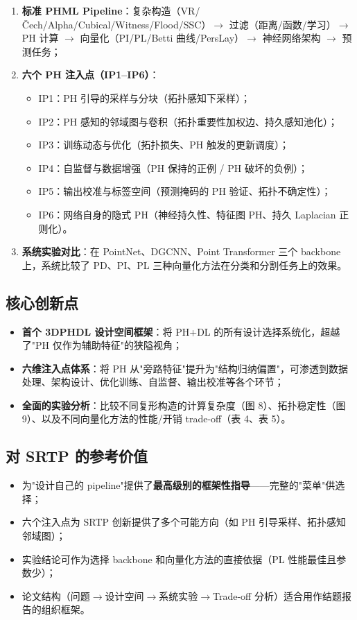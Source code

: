 \documentclass[11pt,a4paper]{article}
\begin{document}
\begin{enumerate}[nosep]
  \item \textbf{标准 PHML Pipeline}：复杂构造（VR/Čech/Alpha/Cubical/Witness/Flood/SSC）$\to$ 过滤（距离/函数/学习）$\to$ PH 计算 $\to$ 向量化（PI/PL/Betti 曲线/PersLay）$\to$ 神经网络架构 $\to$ 预测任务；
  \item \textbf{六个 PH 注入点（IP1--IP6）}：
    \begin{itemize}[nosep]
      \item IP1：PH 引导的采样与分块（拓扑感知下采样）；
      \item IP2：PH 感知的邻域图与卷积（拓扑重要性加权边、持久感知池化）；
      \item IP3：训练动态与优化（拓扑损失、PH 触发的更新调度）；
      \item IP4：自监督与数据增强（PH 保持的正例 / PH 破坏的负例）；
      \item IP5：输出校准与标签空间（预测掩码的 PH 验证、拓扑不确定性）；
      \item IP6：网络自身的隐式 PH（神经持久性、特征图 PH、持久 Laplacian 正则化）。
    \end{itemize}
  \item \textbf{系统实验对比}：在 PointNet、DGCNN、Point Transformer 三个 backbone 上，系统比较了 PD、PI、PL 三种向量化方法在分类和分割任务上的效果。
\end{enumerate}

\subsection*{核心创新点}
\begin{itemize}[nosep]
  \item \textbf{首个 3DPHDL 设计空间框架}：将 PH+DL 的所有设计选择系统化，超越了"PH 仅作为辅助特征"的狭隘视角；
  \item \textbf{六维注入点体系}：将 PH 从"旁路特征"提升为"结构归纳偏置"，可渗透到数据处理、架构设计、优化训练、自监督、输出校准等各个环节；
  \item \textbf{全面的实验分析}：比较不同复形构造的计算复杂度（图 8）、拓扑稳定性（图 9）、以及不同向量化方法的性能/开销 trade-off（表 4、表 5）。
\end{itemize}

\subsection*{对 SRTP 的参考价值}
\begin{itemize}[nosep]
  \item 为"设计自己的 pipeline"提供了\textbf{最高级别的框架性指导}——完整的"菜单"供选择；
  \item 六个注入点为 SRTP 创新提供了多个可能方向（如 PH 引导采样、拓扑感知邻域图）；
  \item 实验结论可作为选择 backbone 和向量化方法的直接依据（PL 性能最佳且参数少）；
  \item 论文结构（问题$\to$设计空间$\to$系统实验$\to$Trade-off 分析）适合用作结题报告的组织框架。
\end{itemize}
\end{document}
